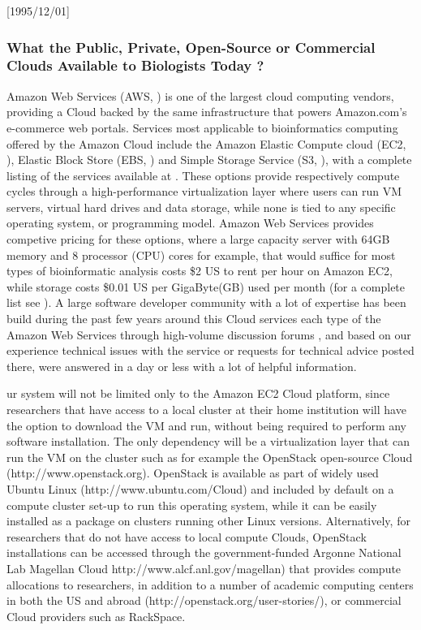 \NeedsTeXFormat{LaTeX2e}[1995/12/01] \documentclass[10pt]{bmc_article}
\newenvironment{bmcformat}{\begin{raggedright}\baselineskip20pt\sloppy\setboolean{publ}{false}}{\end{raggedright}\baselineskip20pt\sloppy}
\begin{document}
\begin{bmcformat}
\subsubsection*{What the Public, Private, Open-Source or Commercial Clouds Available to Biologists Today ?} 

Amazon Web Services (AWS, \cite{aws}) is one of the largest cloud computing vendors, providing a Cloud backed  
by the same infrastructure that powers Amazon.com's e-commerce web portals. Services most applicable to 
bioinformatics computing offered by the Amazon Cloud include the Amazon Elastic Compute cloud (EC2, \cite{awsec2}),  
Elastic Block Store (EBS, \cite{ebs}) and Simple Storage Service (S3, \cite{s3}), with a complete listing of the services
available at \cite{aws}. These options provide respectively compute cycles through a high-performance 
virtualization layer where users can run VM servers, virtual hard drives and data storage, while none
is tied to any specific operating system, or programming model. Amazon Web Services provides competive
pricing for these options, where a large capacity server with 64GB memory and 8 processor (CPU) cores for 
example, that would suffice for most types of bioinformatic analysis costs \$2 US to rent per hour 
on Amazon EC2, while storage costs \$0.01 US per GigaByte(GB) used per month (for a complete list see \cite{ec2price}). 
A large software developer community with a lot of expertise has been build during the past few years around 
this Cloud services each type of the Amazon Web Services through high-volume discussion forums \cite{awsforums}, 
and based on our experience technical issues with the service or requests for technical advice posted there, were 
answered in a day or less with a lot of helpful information.


ur system will not be limited only to the Amazon EC2 Cloud platform, since researchers that have access to a
local cluster at their home institution will have the option to download the VM and run, without being
required to perform any software installation.  The only dependency will be a virtualization layer that can
run the VM on the cluster such as for example the OpenStack open-source Cloud (http://www.openstack.org).
OpenStack is available as part of widely used Ubuntu Linux (http://www.ubuntu.com/Cloud) and included by
default on a compute cluster set-up to run this operating system, while it can be easily installed as a
package on clusters running other Linux versions. Alternatively, for researchers that do not have access to
local compute Clouds, OpenStack installations can be accessed through the government-funded Argonne National
Lab Magellan Cloud http://www.alcf.anl.gov/magellan) that provides compute allocations to researchers, in
addition to a number of academic computing centers in both the US and abroad
(http://openstack.org/user-stories/), or commercial Cloud providers such as RackSpace.


\end{bmcformat}
\end{document}
